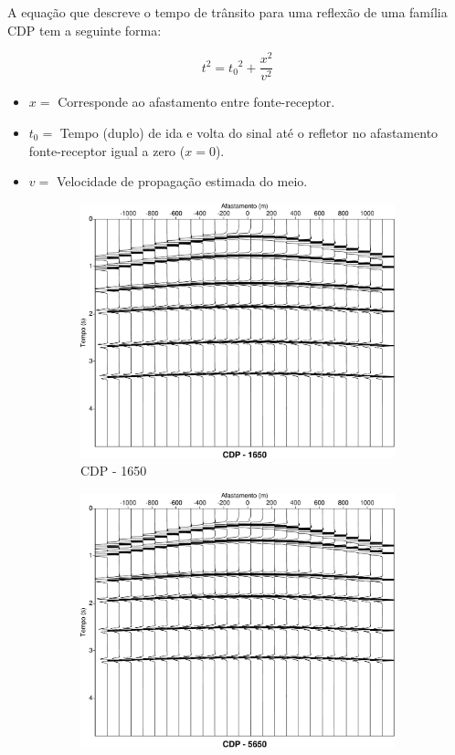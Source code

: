 A equação que descreve o tempo de trânsito para uma reflexão de uma família CDP tem a seguinte forma:

\begin{equation}
t^{2}={t_0}^2+\frac{x^2}{v^2}
\label{eq:tempo_de_transito}
\end{equation}

\begin{itemize}
\item $x=$ Corresponde ao afastamento entre fonte-receptor.
\item $t_0=$ Tempo (duplo) de ida e volta do sinal até o refletor no afastamento fonte-receptor igual a zero ($x=0$).
\item $v=$ Velocidade de propagação estimada do meio.
\end{itemize}


\begin{landscape}
\begin{figure}[H]
    \centering
    \begin{subfigure}[b]{.80\textwidth}
        \centering
        \includegraphics[width=12cm]{figuras/cap2/cmp1650.pdf}
        \caption{CDP - 1650}
        \label{fig:figure_a}
    \end{subfigure}%
    \begin{subfigure}[b]{.80\textwidth}
        \centering
        \includegraphics[width=12cm]{figuras/cap2/cmp5650.pdf}

\end{subfigure}
\end{figure}
\end{landscape}
